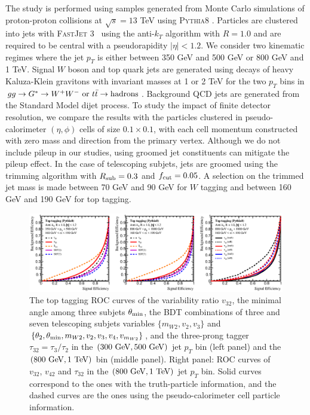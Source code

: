 \documentclass[aps,prl,floatfix,preprintnumbers,twocolumn,groupedaddress,nofootinbib]{revtex4-1}
\begin{document}
The study is performed using samples generated from Monte Carlo simulations of proton-proton collisions at $\sqrt{s}=13$ TeV using \textsc{Pythia8} \cite{Sjostrand:2007gs}. Particles are clustered into jets with \textsc{FastJet} 3~\cite{Cacciari:2011ma} using the anti-$k_T$ algorithm \cite{Cacciari:2008gp} with $R=1.0$ and are required to be central with a pseudorapidity $|\eta|<1.2$. We consider two kinematic regimes where the jet $p_T$ is either between 350 GeV and 500 GeV or 800 GeV and 1 TeV. Signal $W$ boson and top quark jets are generated using decays of heavy Kaluza-Klein gravitons with invariant masses at 1 or 2 TeV for the two $p_T$ bins in $gg\rightarrow G^*\rightarrow W^+W^-~{\rm or}~t\bar t\rightarrow {\rm hadrons}$. Background QCD jets are generated from the Standard Model dijet process. To study the impact of finite detector resolution, we compare the results with the particles clustered in pseudo-calorimeter $(\eta,\phi)$ cells of size $0.1\times 0.1$, with each cell momentum constructed with zero mass and direction from the primary vertex. Although we do not include pileup in our studies, using groomed jet constituents can mitigate the pileup effect. In the case of telescoping subjets, jets are groomed using the trimming algorithm with $R_{\rm sub}=0.3$ and $f_{\rm cut}=0.05$. A selection on the trimmed jet mass is made between 70 GeV and 90 GeV for $W$ tagging and between 160 GeV and 190 GeV for top tagging.

\begin{figure}
    \includegraphics[width=2\columnwidth]{plots/Top_ROCs_2.eps}
    \caption{The top tagging ROC curves of the variability ratio $v_{32}$, the minimal angle among three subjets $\theta_{\rm min}$, the BDT combinations of three and seven telescoping subjets variables $\{m_{W2},v_2,v_3\}$ and $\{\theta_2,\theta_{\rm min},m_{W2},v_2,v_3,v_4,v_{m_{W2}}\}$, and the three-prong tagger $\tau_{32}=\tau_{3}/\tau_{2}$ in the $(300~{\rm GeV}, 500~{\rm GeV})$ jet $p_T$ bin (left panel) and the $(800~{\rm GeV}, 1~{\rm TeV})$ bin (middle panel). Right panel: ROC curves of $v_{32}$, $v_{42}$ and $\tau_{32}$ in the $(800~{\rm GeV}, 1~{\rm TeV})$ jet $p_T$ bin. Solid curves correspond to the ones with the truth-particle information, and the dashed curves are the ones using the pseudo-calorimeter cell particle information.}
\label{ROC_top}
\end{figure}
\end{document}
